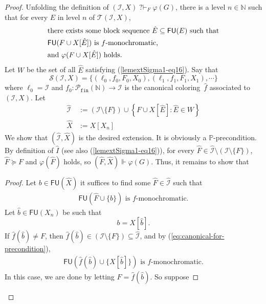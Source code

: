 \documentclass[10pt,a4paper]{article}
\def\PP{\mathbb{P}}
\def\Tc{\mathcal{T}}
\def\Sc{\mathcal{S}}
\def\I{\mathcal{I}}
\newcommand{\qvdash}{\operatorname{{?}{\vdash}}}
\newcommand{\NN}[0]{\mathbb{N}}
\newcommand{\Pfin}{\mathcal{P}_{\mathtt{fin}}}
\newcommand{\FU}[0]{\mathsf{FU}} %
\def\h#1{\hat{#1}}
\numberwithin{theorem}{section}
\newtheorem{claim}{Claim}
\begin{document}
\begin{proof}
Unfolding the definition of
$(\I,X)\qvdash_F\varphi(G)$, there is a level $n \in \NN$
such that for every $E$ in level $n$ of  $\Tc(\I, X)$,
\begin{align}\label{lemextSigma1-eq16}
& \text{there exists some  
block sequence $\hat E\subseteq \FU(E)$ 
such that}\notag \\ 
& \text{$\FU(F \cup X[\hat E])$ is $f$-monochromatic,} \notag\\
& \text{and $\varphi(F \cup X[\hat E])$ holds}.
\end{align}
Let $W$ be the set of all $\h E$ satisfying (\ref{lemextSigma1-eq16}).
Say that 
$$
\Sc(\I, X) = \{ (\ell_0, f_0, F_0, X_0), (\ell_1, f_1, F_1, X_1), \cdots \}
$$
where $\ell_0 = \I$ and $f_0 : \Pfin(\NN) \to \I$ is the canonical coloring~$\h f$ associated to $(\I, X)$.
Let
\begin{align}\label{lemextSigma1-eq17}
\h \I & := (\I \setminus \{F\}) \cup \left\{ F \cup X[\h E] : \h E \in W \right\} \\
\h X & := X[X_n]\nonumber
\end{align}
We show that $(\h \I,\h X)$ is the desired extension.
It is obviously a $\PP$-precondition.
By definition of $\h I$ (see also (\ref{lemextSigma1-eq16})),
for every $\h F\in \h \I \setminus (\I \setminus \{F\})$, $\h F \succeq F$ and $\varphi(\h F)$ holds, so $(\h F,\h X)\Vdash\varphi(G)$.
Thus, it remains to show that
\begin{proof}
Let 
$b\in \FU(\h X)$
it suffices to find some $\h F \in \h \I$ such that 
\begin{align}\label{lemextSigma1-eq20}
\FU(\h F \cup \{b\})\text{ is $f$-monochromatic.}
\end{align}
Let 
$\hat b\in \FU(X_n)$
be such that
$$b = X[\h b].$$
If $\h f(\h b) \neq F$, then $\h f(\h b) \in (\I \setminus \{F\}) \subseteq \h \I$, and by (\ref{eq:canonical-for-precondition}),
\begin{align}\label{lemextSigma1-eq20-second-display}
\FU(\h f(\h b) \cup \{X[\h b]\})\text{ is $f$-monochromatic.}
\end{align}
In this case, we are done by letting $\h F = \h f(\h b)$. So suppose

\end{proof}
\end{proof}
\end{document}
